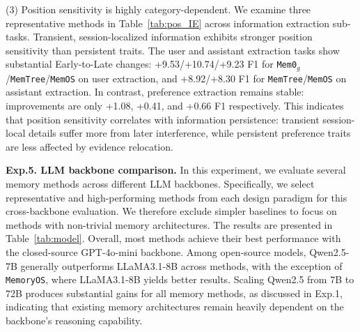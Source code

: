 (3) Position sensitivity is highly category-dependent. We examine three representative methods in Table~\ref{tab:pos_IE} across information extraction sub-tasks. Transient, session-localized information exhibits stronger position sensitivity than persistent traits. The user and assistant extraction tasks show substantial Early-to-Late changes: +9.53/+10.74/+9.23 F1 for {\tt Mem0$_g$}/{\tt MemTree}/{\tt MemOS} on user extraction, and +8.92/+8.30 F1 for {\tt MemTree}/{\tt MemOS} on assistant extraction. In contrast, preference extraction remains stable: improvements are only +1.08, +0.41, and +0.66 F1 respectively. This indicates that position sensitivity correlates with information persistence: transient session-local details suffer more from later interference, while persistent preference traits are less affected by evidence relocation.




\textbf{Exp.5. LLM backbone comparison.}
In this experiment, we evaluate several memory methods across different LLM backbones. Specifically, we select representative and high-performing methods from each design paradigm for this cross-backbone evaluation. We therefore exclude simpler baselines to focus on methods with non-trivial memory architectures. The results are presented in Table~\ref{tab:model}. 
Overall, most methods achieve their best performance with the closed-source GPT-4o-mini backbone. Among open-source models, Qwen2.5-7B generally outperforms LLaMA3.1-8B across methods, with the exception of {\tt MemoryOS}, where LLaMA3.1-8B yields better results. Scaling Qwen2.5 from 7B to 72B produces substantial gains for all memory methods, as discussed in Exp.1, indicating that existing memory architectures remain heavily dependent on the backbone's reasoning capability.



